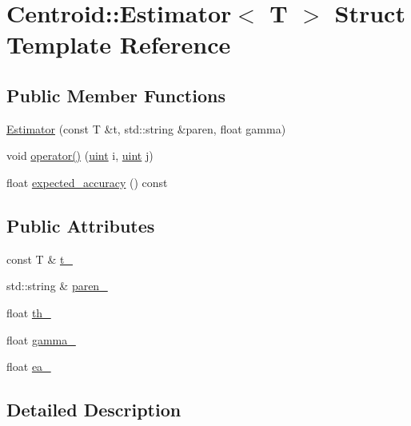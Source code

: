 \hypertarget{struct_centroid_1_1_estimator}{\section{Centroid\+:\+:Estimator$<$ T $>$ Struct Template Reference}
\label{struct_centroid_1_1_estimator}
}
\subsection*{Public Member Functions}
\begin{DoxyCompactItemize}
\item 
\hyperlink{struct_centroid_1_1_estimator_a7a50661ee30722b56662bc7f2c55dd37}{Estimator} (const T \&t, std\+::string \&paren, float gamma)
\item 
void \hyperlink{struct_centroid_1_1_estimator_a558db229a035aa52e265bed449e9fbe6}{operator()} (\hyperlink{cyktable_8h_a91ad9478d81a7aaf2593e8d9c3d06a14}{uint} i, \hyperlink{cyktable_8h_a91ad9478d81a7aaf2593e8d9c3d06a14}{uint} j)
\item 
float \hyperlink{struct_centroid_1_1_estimator_a03f33ccedc9616b7e13743a6d63a86ac}{expected\+\_\+accuracy} () const 
\end{DoxyCompactItemize}
\subsection*{Public Attributes}
\begin{DoxyCompactItemize}
\item 
const T \& \hyperlink{struct_centroid_1_1_estimator_a877f55030c8443d3f26dc7d17ff0bbff}{t\+\_\+}
\item 
std\+::string \& \hyperlink{struct_centroid_1_1_estimator_afb0a8a732c11deb042d0bb1ac5bb54ce}{paren\+\_\+}
\item 
float \hyperlink{struct_centroid_1_1_estimator_a3c52755a2eea48a354dfb71eba71600f}{th\+\_\+}
\item 
float \hyperlink{struct_centroid_1_1_estimator_ad22e480a14f6b3217c53ebd4c300e1d0}{gamma\+\_\+}
\item 
float \hyperlink{struct_centroid_1_1_estimator_ad06b2a1760cef4bfd901adb4fc1cdd8c}{ea\+\_\+}
\end{DoxyCompactItemize}


\subsection{Detailed Description}
